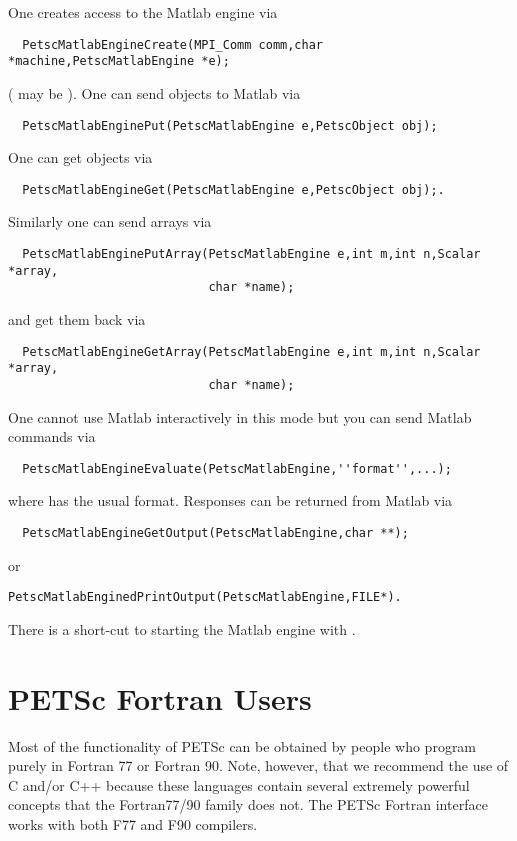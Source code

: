 One creates access to the Matlab engine via 
\begin{verbatim}
  PetscMatlabEngineCreate(MPI_Comm comm,char *machine,PetscMatlabEngine *e);
\end{verbatim}
( may be ).
One can send objects to Matlab via 
\begin{verbatim}
  PetscMatlabEnginePut(PetscMatlabEngine e,PetscObject obj);
\end{verbatim}
One can get objects
via 
\begin{verbatim}
  PetscMatlabEngineGet(PetscMatlabEngine e,PetscObject obj);.
\end{verbatim}
Similarly one can send arrays via
\begin{verbatim}
  PetscMatlabEnginePutArray(PetscMatlabEngine e,int m,int n,Scalar *array,
                            char *name);
\end{verbatim}
and get them back via
\begin{verbatim}
  PetscMatlabEngineGetArray(PetscMatlabEngine e,int m,int n,Scalar *array,
                            char *name);
\end{verbatim}
One cannot use Matlab
interactively in this mode but you can send Matlab commands via
\begin{verbatim}
  PetscMatlabEngineEvaluate(PetscMatlabEngine,''format'',...);
\end{verbatim}
where  has the usual  format.
Responses can be returned from Matlab via 
\begin{verbatim}
  PetscMatlabEngineGetOutput(PetscMatlabEngine,char **); 
\end{verbatim}
or
\begin{verbatim}
PetscMatlabEnginedPrintOutput(PetscMatlabEngine,FILE*).
\end{verbatim}
There is a short-cut to starting the Matlab engine
with .



\chapter{PETSc Fortran Users}
\label{ch:fortran}

Most of the functionality of PETSc can be obtained by people who
program purely in Fortran 77 or Fortran 90.  Note, however, that we recommend the
use of C and/or C++ because these languages contain several extremely powerful
concepts that the Fortran77/90 family does not. 
The PETSc Fortran interface works with both F77 and F90 compilers.

